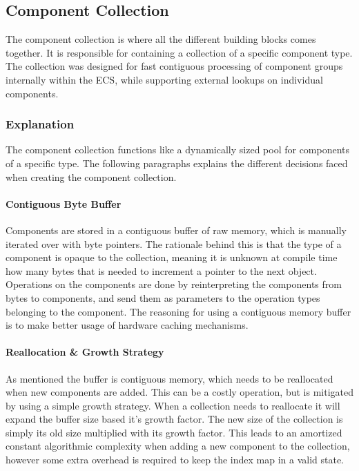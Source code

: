 \subsection{Component Collection}
\label{subsec:detailed_component_collection}
The component collection is where all the different building blocks comes together.
It is responsible for containing a collection of a specific component type.
The collection was designed for fast contiguous processing of component groups internally within the ECS,
while supporting external lookups on individual components.

\subsubsection{Explanation}
The component collection functions like a dynamically sized pool for components of a specific type.
The following paragraphs explains the different decisions faced when creating the component collection.

\paragraph{Contiguous Byte Buffer}
Components are stored in a contiguous buffer of raw memory,
which is manually iterated over with byte pointers.
The rationale behind this is that the type of a component is opaque
to the collection, meaning it is unknown at compile time
how many bytes that is needed to increment a pointer to the next object.
Operations on the components are done by reinterpreting the components from bytes to components,
and send them as parameters to the operation types belonging to the component.
The reasoning for using a contiguous memory buffer is to make better usage of hardware caching mechanisms.

\paragraph{Reallocation \& Growth Strategy}
As mentioned the buffer is contiguous memory, which needs to be reallocated when new components are added.
This can be a costly operation, but is mitigated by using a simple growth strategy.
When a collection needs to reallocate it will expand the buffer size based it's growth factor.
The new size of the collection is simply its old size multiplied with its growth factor.
This leads to an amortized constant algorithmic complexity when adding a new component to the collection,
however some extra overhead is required to keep the index map in a valid state.

